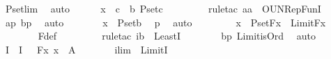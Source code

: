 \begin{isabellebody}
\ P{\isacharunderscore}{\kern0pt}set{\isacharunderscore}{\kern0pt}lim\ \isamarkupfalse%
\ auto\isanewline
\ \ \ \ \isamarkupfalse%
\ {\isachardoublequoteopen}x\ {\isasymin}\ {\isacharparenleft}{\kern0pt}{\isasymUnion}c\ {\isacharless}{\kern0pt}\ b{\isachardot}{\kern0pt}\ P{\isacharunderscore}{\kern0pt}set{\isacharparenleft}{\kern0pt}c{\isacharparenright}{\kern0pt}{\isacharparenright}{\kern0pt}{\isachardoublequoteclose}\ \isanewline
\ \ \ \ \ \ \isamarkupfalse%
\ {\isacharparenleft}{\kern0pt}rule{\isacharunderscore}{\kern0pt}tac\ a{\isacharequal}{\kern0pt}a\ \ OUN{\isacharunderscore}{\kern0pt}RepFunI{\isacharparenright}{\kern0pt}\ \isamarkupfalse%
\ ap\ bp\ \isamarkupfalse%
\ auto\isanewline
\ \ \ \ \isamarkupfalse%
\ \isamarkupfalse%
\ {\isachardoublequoteopen}x\ {\isasymin}\ P{\isacharunderscore}{\kern0pt}set{\isacharparenleft}{\kern0pt}b{\isacharparenright}{\kern0pt}{\isachardoublequoteclose}\ \isamarkupfalse%
\ p{}\ \isamarkupfalse%
\ auto\ \isanewline
\ \ \ \ \isamarkupfalse%
\ \isamarkupfalse%
\ {\isachardoublequoteopen}x\ {\isasymin}\ P{\isacharunderscore}{\kern0pt}set{\isacharparenleft}{\kern0pt}F{\isacharparenleft}{\kern0pt}x{\isacharparenright}{\kern0pt}{\isacharparenright}{\kern0pt}\ {\isasymand}\ Limit{\isacharparenleft}{\kern0pt}F{\isacharparenleft}{\kern0pt}x{\isacharparenright}{\kern0pt}{\isacharparenright}{\kern0pt}{\isachardoublequoteclose}\isanewline
\ \ \ \ \ \ \isamarkupfalse%
\ F{\isacharunderscore}{\kern0pt}def\ \isanewline
\ \ \ \ \ \ \isamarkupfalse%
\ {\isacharparenleft}{\kern0pt}rule{\isacharunderscore}{\kern0pt}tac\ i{\isacharequal}{\kern0pt}b\ \ LeastI{\isacharparenright}{\kern0pt}\isanewline
\ \ \ \ \ \ \isamarkupfalse%
\ bp\ Limit{\isacharunderscore}{\kern0pt}is{\isacharunderscore}{\kern0pt}Ord\ \isamarkupfalse%
\ auto\ \isanewline
\ \ \isamarkupfalse%
\isanewline
\ \ \isamarkupfalse%
\ I\ \ {\isachardoublequoteopen}I\ {\isasymequiv}\ {\isasymUnion}{\isacharbraceleft}{\kern0pt}\ F{\isacharparenleft}{\kern0pt}x{\isacharparenright}{\kern0pt}{\isachardot}{\kern0pt}\ x\ {\isasymin}\ A\ {\isacharbraceright}{\kern0pt}{\isachardoublequoteclose}\ \isanewline
\ \ \isamarkupfalse%
\ \isamarkupfalse%
\ ilim\ {\isacharcolon}{\kern0pt}\ {\isachardoublequoteopen}Limit{\isacharparenleft}{\kern0pt}I{\isacharparenright}{\kern0pt}{\isachardoublequoteclose}\ \isanewline

\end{isabellebody}
